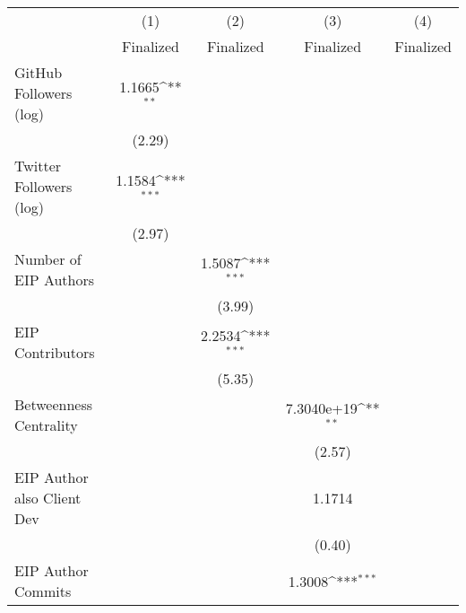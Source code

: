 {
\def\sym#1{\ifmmode^{#1}\else\(^{#1}\)\fi}
\begin{tabular}{l*{4}{c}}
\hline\hline
                                   &\multicolumn{1}{c}{(1)}         &\multicolumn{1}{c}{(2)}         &\multicolumn{1}{c}{(3)}         &\multicolumn{1}{c}{(4)}         \\
                                   &   Finalized         &   Finalized         &   Finalized         &   Finalized         \\
\hline
GitHub Followers (log)             &      1.1665\sym{**} &                     &                     &                     \\
                                   &      (2.29)         &                     &                     &                     \\
[1em]
Twitter Followers (log)            &      1.1584\sym{***}&                     &                     &                     \\
                                   &      (2.97)         &                     &                     &                     \\
[1em]
Number of EIP Authors              &                     &      1.5087\sym{***}&                     &                     \\
                                   &                     &      (3.99)         &                     &                     \\
[1em]
EIP Contributors                   &                     &      2.2534\sym{***}&                     &                     \\
                                   &                     &      (5.35)         &                     &                     \\
[1em]
Betweenness Centrality             &                     &                     &  7.3040e+19\sym{**} &                     \\
                                   &                     &                     &      (2.57)         &                     \\
[1em]
EIP Author also Client Dev         &                     &                     &      1.1714         &                     \\
                                   &                     &                     &      (0.40)         &                     \\
[1em]
EIP Author Commits                 &                     &                     &      1.3008\sym{***}&                     \\

\end{tabular}}
